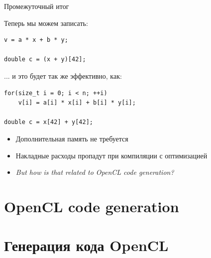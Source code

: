 \documentclass[@BEAMER_OPTIONS@]{beamer}
\begin{document}
\begin{frame}[fragile]{Промежуточный итог}
    \begin{exampleblock}{Теперь мы можем записать:}
        \begin{lstlisting}
v = a * x + b * y;

double c = (x + y)[42];
        \end{lstlisting}
    \end{exampleblock}

    \begin{exampleblock}{... и это будет так же эффективно, как:}
        \begin{lstlisting}
for(size_t i = 0; i < n; ++i)
    v[i] = a[i] * x[i] + b[i] * y[i];

double c = x[42] + y[42];
        \end{lstlisting}
    \end{exampleblock}
    \begin{itemize}
        \item Дополнительная память не требуется
        \item Накладные расходы пропадут при компиляции с оптимизацией
            \vspace{\baselineskip}
            \pause
        \item<alert@2> \emph{But how is that related to OpenCL code generation?}
    \end{itemize}
\end{frame}


\section{OpenCL code generation}
\begin{frame}
    \sectionpage
\end{frame}

\note{ }

\section{Генерация кода OpenCL}
\begin{frame}
    \sectionpage
\end{frame}
\end{document}
